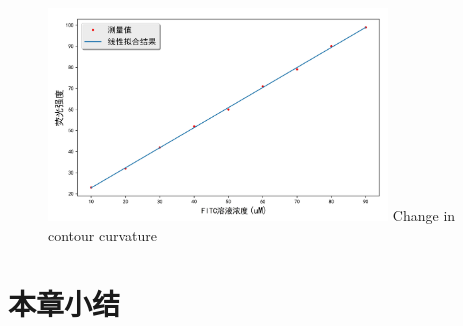 	
	\begin{figure}[htbp]
	  \centering
	  \includegraphics[width=9cm]{figure/chap2/fluence.jpg}
		{Change in contour curvature}
	  \label{fig:chap2:fluence}
	\end{figure}
\section{本章小结}
